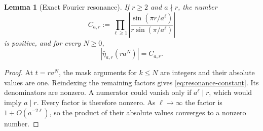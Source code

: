\documentclass[11pt,a4paper]{article}
\newtheorem{lemma}[theorem]{Lemma}
\theoremstyle{definition}
\theoremstyle{remark}
\begin{document}
\begin{lemma}[Exact Fourier resonance]\label{lem:resonance}
If $r\ge2$ and $a\nmid r$, the number
\begin{equation}\label{eq:resonance-constant}
 C_{a,r}:=\prod_{\ell\ge1}
 \left|\frac{\sin(\pi r/a^\ell)}{r\sin(\pi/a^\ell)}\right|
\end{equation}
is positive, and for every $N\ge0$,
\begin{equation}\label{eq:resonance}
 |\widehat\eta_{a,r}(ra^N)|=C_{a,r}.
\end{equation}
\end{lemma}
\begin{proof}
At $t=ra^N$, the mask arguments for $k\le N$ are integers and their
absolute values are one. Reindexing the remaining factors gives
\eqref{eq:resonance-constant}. Its denominators are nonzero. A numerator
could vanish only if $a^\ell\mid r$, which would imply $a\mid r$.
Every factor is therefore nonzero. As $\ell\to\infty$ the factor is
$1+O(a^{-2\ell})$, so the product of their absolute values converges to
a nonzero number.
\end{proof}
\end{document}
